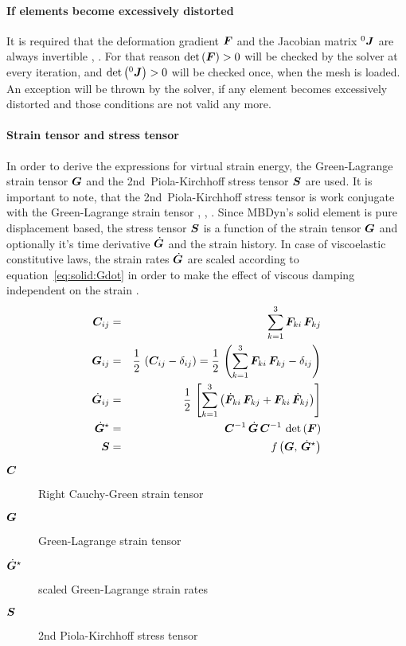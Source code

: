 \paragraph{If elements become excessively distorted}
It is required that the deformation gradient $\bm{F}$ and the Jacobian matrix ${^0}\bm{J}$ are always invertible \cite{BATHE2016}, \cite{KUEBLER2005}.
For that reason $\det{\left(\bm{F}\right)}>0$ will be checked by the solver at every iteration, and $\det{\left({^0}\bm{J}\right)}>0$ will be checked
once, when the mesh is loaded. An exception will be thrown by the solver, if any element becomes excessively distorted and those conditions are not valid any more.

\paragraph{Strain tensor and stress tensor}
In order to derive the expressions for virtual strain energy, the Green-Lagrange strain tensor $\bm{G}$ and the 2nd~Piola-Kirchhoff stress tensor $\bm{S}$ are used.
It is important to note, that the 2nd~Piola-Kirchhoff stress tensor is work conjugate with the Green-Lagrange strain tensor \cite{WALLRAPP1998}, \cite{BATHE2016}, \cite{KUEBLER2005}.
Since MBDyn's solid element is pure displacement based, the stress tensor $\bm{S}$ is a function of the strain tensor $\bm{G}$ and optionally it's time derivative $\dot{\bm{G}}$ and the strain history.
In case of viscoelastic constitutive laws, the strain rates $\dot{\bm{G}}$ are scaled according to equation~\ref{eq:solid:Gdot} in order to make the effect of viscous damping independent on the strain \cite{KUEBLER2005}.
\begin{eqnarray}
\bm{C}_{ij} & = & \sum_{k=1}^3\bm{F}_{ki}\,\bm{F}_{kj} \\
\bm{G}_{ij} & = & \frac{1}{2} \, \left(\bm{C}_{ij} - \delta_{ij} \right) = \frac{1}{2} \, \left(\sum_{k=1}^3\bm{F}_{ki}\,\bm{F}_{kj} - \delta_{ij}\right) \label{eq:solid:G} \\
\dot{\bm{G}}_{ij} & = & \frac{1}{2} \, \left[\sum_{k=1}^3\left(\dot{\bm{F}}_{ki}\,\bm{F}_{kj} + \bm{F}_{ki}\,\dot{\bm{F}}_{kj} \right)\right] \\
\dot{\bm{G}}^{\star} & = & \bm{C}^{-1} \, \dot{\bm{G}} \, \bm{C}^{-1} \, \det{\left(\bm{F}\right)} \label{eq:solid:Gdot} \\
\bm{S} & = & \mathit{f}\left(\bm{G}, \, \dot{\bm{G}}^{\star}\right)
\end{eqnarray}

\begin{description}
\item[$\bm{C}$] Right Cauchy-Green strain tensor
\item[$\bm{G}$] Green-Lagrange strain tensor
\item[$\dot{\bm{G}}^{\star}$] scaled Green-Lagrange strain rates
\item[$\bm{S}$] 2nd Piola-Kirchhoff stress tensor
\end{description}

